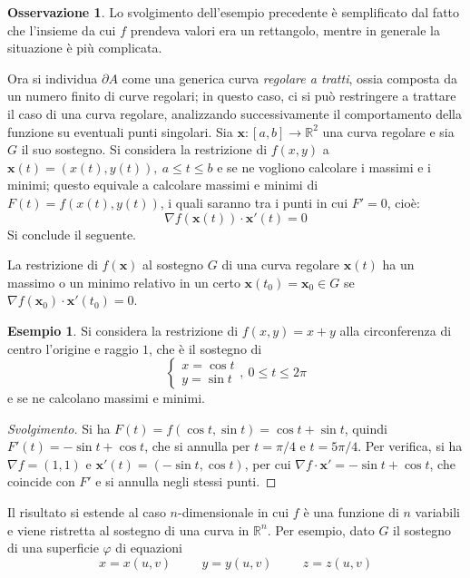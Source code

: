 \documentclass[10pt, a4paper]{scrartcl}
\newenvironment{svolgimento}{\renewcommand\qedsymbol{$\blacksquare$}\begin{proof}[Svolgimento]}{\end{proof}}
\theoremstyle{definition}
\newtheorem{esempio}{Esempio}
\numberwithin{esempio}{section}
\theoremstyle{definition}
\newtheorem{obs}{Osservazione}
\numberwithin{obs}{section}
\numberwithin{nota}{section}
\numberwithin{equation}{subsection}
\begin{document}
\begin{obs}
Lo svolgimento dell'esempio precedente \`e semplificato dal fatto che l'insieme da cui $f$ prendeva valori era un rettangolo, mentre in generale la situazione \`e pi\`u complicata.
\end{obs}
Ora si individua $\partial A$ come una generica curva \textit{regolare a tratti}, ossia composta da un numero finito di curve regolari; in questo caso, ci si pu\`o restringere a trattare il caso di una curva regolare, analizzando successivamente il comportamento della funzione su eventuali punti singolari.
Sia $\mathbf{x} : \left[ a,b \right] \to \mathbb{R}^2$ una curva regolare e sia $G$ il suo sostegno. 
Si considera la restrizione di $f(x,y)$ a $\mathbf{x}(t) = (x(t),y(t)), \ a\le t\le b$ e se ne vogliono calcolare i massimi e i minimi; questo equivale a calcolare massimi e minimi di $F(t) = f(x(t), y(t))$, i quali saranno tra i punti in cui $F' = 0$, cio\`e:
\[
\nabla f(\mathbf{x} (t)) \cdot \mathbf{x} '(t) = 0 
\] 
Si conclude il seguente.
\begin{teorema}
	{}{}
	La restrizione di $f(\mathbf{x} )$ al sostegno $G$ di una curva regolare $\mathbf{x} (t)$ ha un massimo o un minimo relativo in un certo $\mathbf{x} (t_0) = \mathbf{x} _0 \in G$ se $\nabla f(\mathbf{x} _0) \cdot \mathbf{x} '(t_0) = 0 $.
\end{teorema}
\begin{esempio}
Si considera la restrizione di $f(x,y)=x+y$ alla circonferenza di centro l'origine e raggio $1$, che \`e il sostegno di 
\[
\begin{cases}
	x =\cos t\\
	y= \sin t
\end{cases}, \  0\le t \le  2\pi
\] 
e se ne calcolano massimi e minimi.
\begin{svolgimento}
Si ha $F(t) = f(\cos t, \sin t) = \cos t + \sin t$, quindi $F' (t) = - \sin t + \cos t$, che si annulla per $t = \pi / 4$  e $t =  5 \pi /4$.
Per verifica, si ha $\nabla f = (1,1)$ e $\mathbf{x}' (t) = (-\sin t, \cos t)$, per cui $\nabla f \cdot \mathbf{x} ' = - \sin t + \cos t$, che coincide con $F'$ e si annulla negli stessi punti.
\end{svolgimento}
\end{esempio}
Il risultato si estende al caso $n$-dimensionale in cui $f$ \`e una funzione di $n$ variabili e viene ristretta al sostegno di una curva in $\mathbb{R}^n$.
Per esempio, dato $G$ il sostegno di una superficie $\varphi $ di equazioni
\[
	x = x(u,v) \hspace{1cm} y = y(u,v)  \hspace{1cm} z = z(u,v)
\] 
\end{document}
